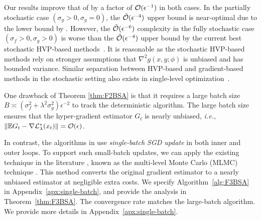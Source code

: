 \documentclass[twoside,11pt]{article}
\begin{document}
Our results improve that of \citet{kwon2023fully} by a factor of ${\mathcal{O}}(\epsilon^{-1})$ in both cases.
In the partially stochastic case $(\sigma_g >0, \sigma_g=0)$, the $\tilde {{\mathcal{O}}}(\epsilon^{-4})$ upper bound is near-optimal due to the lower bound by \citet{arjevani2023lower}.
However, the $\tilde {{\mathcal{O}}}(\epsilon^{-6})$ complexity in the fully stochastic case $(\sigma_f >0 , \sigma_g >0)$ is worse than the $\tilde{{\mathcal{O}}}(\epsilon^{-4})$ upper bound by the current best stochastic HVP-based methods~\citep{ji2021bilevel}. It is reasonable as the stochastic HVP-based methods
rely on stronger assumptions that $\nabla^2 g(x,y; \phi) $ is unbiased and has bounded variance. Similar separation between HVP-based and gradient-based methods in the stochastic setting also exists in single-level optimization~\citep{arjevani2020second}. 

\begin{remark}
    One drawback of Theorem \ref{thm:F2BSA} is that it requires a large batch size  $B \asymp (\sigma_f^2 + \lambda^2 \sigma_g^2) \epsilon^{-2}$ to track the deterministic algorithm. The large batch size ensures that the hyper-gradient estimator $G_t$ is nearly unbiased, \textit{i.e.}, $ \Vert {\mathbb{E}} G_t - \nabla {\mathcal{L}}_{\lambda}^*(x_t) \Vert = {\mathcal{O}}(\epsilon)$. 

In contrast, the algorithms in \citep{kwon2023fully} use \textit{single-batch SGD update} in both inner and outer loops.
To support such small-batch updates, we can apply the existing technique in the literature \citep{asi2021stochastic,hu2021bias}, known as the multi-level Monte Carlo (MLMC) technique \citep{blanchet2015unbiased,giles2008multilevel}. This method converts the original gradient estimator to a nearly unbiased estimator at negligible extra costs. We specify Algorithm~\ref{alg:F3BSA} in Appendix~\ref{apx:single-batch}, and provide the analysis in Theorem~\ref{thm:F3BSA}. The convergence rate matches the large-batch algorithm. We provide more details in Appendix~\ref{apx:single-batch}.
\end{remark}




\end{document}

